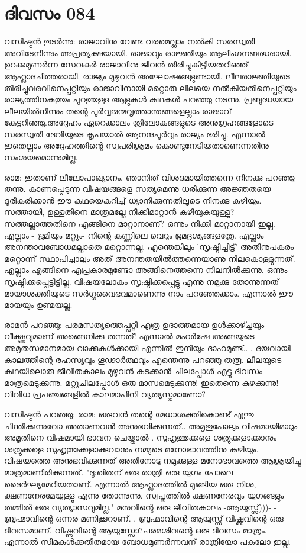 \newpage
\section{ദിവസം 084}


വസിഷ്ഠന്‍ തുടര്‍ന്നു: രാജാവിനു വേണ്ട വരമെല്ലാം നല്‍കി സരസ്വതി അവിടേനിന്നും അപ്രത്യക്ഷയായി. രാജാവും രാജ്ഞിയും ആലിംഗനബദ്ധരായി. ഉറക്കമുണര്‍ന്ന സേവകര്‍ രാജാവിനു ജീവന്‍ തിരിച്ചുകിട്ടിയതറിഞ്ഞ്‌ ആഹ്ലാദചിത്തരായി. രാജ്യം മുഴുവന്‍ അഘോഷങ്ങളുണ്ടായി. ലീലരാജ്ഞിയുടെ തിരിച്ചുവരവിനെപ്പറ്റിയും രാജാവിനായി മറ്റൊരു ലീലയെ നല്‍കിയതിനെപ്പറ്റിയും രാജ്യത്തിനകത്തും പുറത്തുള്ള ആളുകള്‍ കഥകള്‍ പറഞ്ഞു നടന്നു. പ്രബുദ്ധയായ ലീലയില്‍നിന്നും തന്റെ പൂര്‍വ്വജന്മവൃത്താന്തങ്ങളെല്ലാം രാജാവ്‌ കേട്ടറിഞ്ഞു.അദ്ദേഹം ഏറെക്കാലം ത്രിലോകങ്ങളുടെ അനുഗ്രഹങ്ങളോടെ സരസ്വതീ ദേവിയുടെ കൃപയാല്‍ ആനന്ദപൂര്‍വ്വം രാജ്യം ഭരിച്ചു. എന്നാല്‍ ഇതെല്ലാം അദ്ദേഹത്തിന്റെ സ്വപരിശ്രമം കൊണ്ടുനേടിയതാണെന്നതിനു സംശയമൊന്നുമില്ല. 

രാമ: ഇതാണ്‌ ലീലോപാഖ്യാനം. ഞാനിത്‌ വിശദമായിത്തന്നെ നിനക്കു പറഞ്ഞു തന്നു. കാണപ്പെടുന്ന വിഷയങ്ങളെ സത്യമെന്നു ധരിക്കുന്ന അജ്ഞതയെ ദൂരീകരിക്കാന്‍ ഈ കഥയെകുറിച്ച്‌ ധ്യാനിക്കുന്നതിലൂടെ നിനക്കു കഴിയും. സത്തായി, ഉള്ളതിനെ മാത്രമല്ലേ നീക്കിമാറ്റാന്‍ കഴിയുകയുള്ളു? സത്തല്ലാത്തതിനെ എങ്ങിനെ മാറ്റാനാണ്‌? ഒന്നും നീക്കി മാറ്റാനായി ഇല്ല. എല്ലാം - ഭൂമിയും മറ്റും- നിന്റെ കണ്ണിലെ വെറും ഭ്രമദൃശ്യങ്ങളത്രേ. എല്ലാം അനന്താവബോധമല്ലാതെ മറ്റൊന്നല്ല. എന്തെങ്കിലും 'സൃഷ്ടിച്ചിട്ട്‌' അതിനുപകരം മറ്റൊന്ന് സ്ഥാപിച്ചാലും അത്‌ അനന്തതയില്‍ത്തന്നെയാണു നിലകൊള്ളുന്നത്‌. എല്ലാം എങ്ങിനെ എപ്രകാരമുണ്ടോ അങ്ങിനെത്തന്നെ നിലനില്‍ക്കുന്നു. ഒന്നും സൃഷ്ടിക്കപ്പെട്ടിട്ടില്ല. വിഷയലോകം സൃഷ്ടിക്കപ്പെട്ടു എന്നു നമുക്കു തോന്നുന്നത്‌ മായാശക്തിയുടെ സര്‍ഗ്ഗവൈഭവമാണെന്നു നാം പറഞ്ഞേക്കാം. എന്നാല്‍ ഈ മായയും ഉണ്മയല്ല.

രാമന്‍ പറഞ്ഞു: പരമസത്യത്തെപ്പറ്റി എത്ര ഉദാത്തമായ ഉള്‍ക്കാഴ്ച്ചയും വീക്ഷ്ണവുമാണ്‌ അങ്ങെനിക്കു തന്നത്‌! എന്നാല്‍ മഹര്‍ഷേ അങ്ങയുടെ അമൃതസമാനമായ വാക്കുകള്‍ക്കായി എന്നില്‍ ഇനിയും ദാഹമുണ്ട്‌.. . ദയവായി കാലത്തിന്റെ രഹസ്യവും ഗൂഢാര്‍ത്ഥവും എന്തെന്നു പറഞ്ഞു തരൂ. ലീലയുടെ കഥയിലൊരു ജീവിതകാലം മുഴുവന്‍ കടക്കാന്‍ ചിലപ്പോള്‍ എട്ടു ദിവസം മാത്രമെടുക്കുന്നു. മറ്റുചിലപ്പോള്‍ ഒരു മാസമെടുക്കുന്നു! ഇതെന്നെ കുഴക്കുന്നു! വിവിധ പ്രപഞ്ചങ്ങളില്‍ കാലമാപിനി വ്യത്യസ്തമാണോ? 

വസിഷ്ഠന്‍ പറഞ്ഞു: രാമ: ഒരുവന്‍ തന്റെ മേധാശക്തികൊണ്ട്‌ എന്തു ചിന്തിക്കുന്നുവോ അതാണവന്‍ അനുഭവിക്കുന്നത്‌.. അമൃതുപോലും വിഷമായിമാറും അമൃതിനെ വിഷമായി ഭാവന ചെയ്താല്‍ .   സുഹൃത്തുക്കളെ  ശത്രുക്കളാക്കാനും ശത്രുക്കളെ സുഹൃത്തുക്കളാക്കുവാനും നമ്മുടെ മനോഭാവത്തിനു കഴിയും. വിഷയത്തെ അനുഭവിക്കുന്നത്‌ അതിനോടു നമുക്കുള്ള മനോഭാവത്തെ ആശ്രയിച്ചു മാത്രമാണിരിക്കുന്നത്‌. "ദു:ഖിതന്‌ ഒരു രാത്രി ഒരു യുഗം പോലെ ദൈര്‍ഘ്യമേറിയതാണ്‌. എന്നാല്‍ ആഹ്ലാദത്തില്‍ മുങ്ങിയ ഒരു നിശ, ക്ഷണനേരമേയുള്ളൂ എന്നു തോന്നുന്നു. സ്വപ്നത്തില്‍ ക്ഷണനേരവും യുഗങ്ങളും തമ്മില്‍ ഒരു വ്യത്യാസവുമില്ല." മനുവിന്റെ ഒരു ജീവിതകാലം -ആയുസ്സ്‌)))- - ബ്രഹ്മാവിന്റെ ഒന്നര മണിക്കൂറാണ്‌. .  ബ്രഹ്മാവിന്റെ ആയുസ്സ്‌ വിഷ്ണുവിന്റെ ഒരു ദിവസമാണ്‌. വിഷ്ണുവിന്റെ ആയുസ്സോ?പരമശിവന്റെ ഒരു ദിവസം മാത്രം. എന്നാല്‍ സീമകള്‍ക്കതീതമായ ബോധമുണര്‍ന്നവന്‌ രാത്രിയോ പകലോ ഇല്ല.

